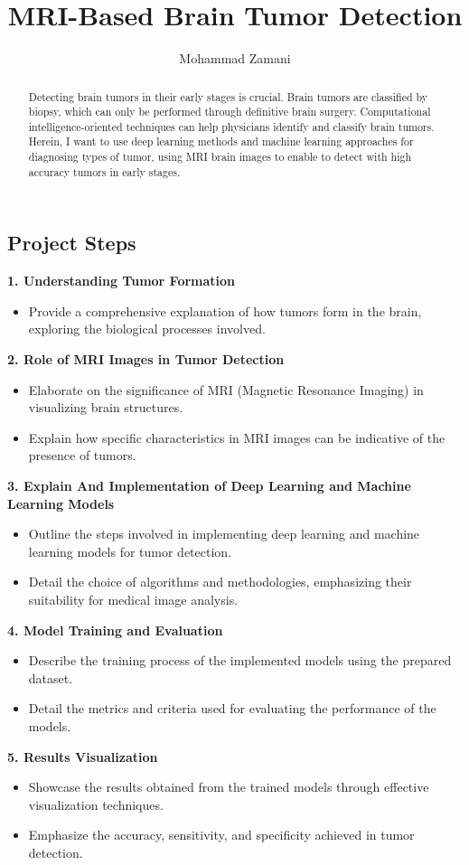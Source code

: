 \documentclass[12pt]{article}
\begin{document}
	
	\title{MRI-Based Brain Tumor Detection}
	\author{Mohammad Zamani}
	\date{}
	\maketitle
	
	\begin{abstract}
		Detecting brain tumors in their early stages is crucial. Brain tumors are classified by biopsy, which can only be performed through definitive brain surgery. Computational intelligence-oriented techniques can help physicians identify and classify brain tumors. Herein, I want to use deep learning methods and machine learning approaches for diagnosing types of tumor, using MRI brain images to enable to detect with high accuracy tumors in early stages.
	\end{abstract}
	
	\subsection*{Project Steps}
	
	\quad \; \textbf{1. Understanding Tumor Formation}
	\begin{itemize}
		\item Provide a comprehensive explanation of how tumors form in the brain, exploring the biological processes involved.
	\end{itemize}
	
	\textbf{2. Role of MRI Images in Tumor Detection}
	\begin{itemize}
		\item Elaborate on the significance of MRI (Magnetic Resonance Imaging) in visualizing brain structures.
		\item Explain how specific characteristics in MRI images can be indicative of the presence of tumors.
	\end{itemize}
	
	\textbf{3. Explain And Implementation of Deep Learning and Machine Learning Models}
	\begin{itemize}
		\item Outline the steps involved in implementing deep learning and machine learning models for tumor detection.
		\item Detail the choice of algorithms and methodologies, emphasizing their suitability for medical image analysis.
	\end{itemize}
	
	\textbf{4. Model Training and Evaluation}
	\begin{itemize}
		\item Describe the training process of the implemented models using the prepared dataset.
		\item Detail the metrics and criteria used for evaluating the performance of the models.
	\end{itemize}
	
	\textbf{5. Results Visualization}
	\begin{itemize}
		\item Showcase the results obtained from the trained models through effective visualization techniques.
		\item Emphasize the accuracy, sensitivity, and specificity achieved in tumor detection.
	\end{itemize}
\end{document}
